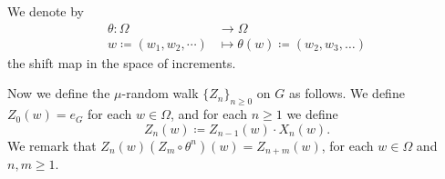 We denote by
	\begin{equation*}
	\begin{aligned}
		\theta:\Omega&\to \Omega\\
		w\coloneqq(w_1,w_2,\cdots)&\mapsto \theta(w)\coloneqq (w_2,w_3,\ldots)
	\end{aligned}
\end{equation*}
the shift map in the space of increments.


Now we define the $\mu$-random walk $\{Z_n\}_{n\ge 0}$ on $G$ as follows. We define $Z_0(w)=e_G$ for each $w\in \Omega$, and for each $n\ge 1$ we define
\[
Z_n(w)\coloneqq Z_{n-1}(w)\cdot X_n(w).
\]
We remark that $Z_n(w) (Z_m\circ \theta^n)(w)=Z_{n+m}(w)$, for each $w\in \Omega$ and $n,m\ge 1$.
